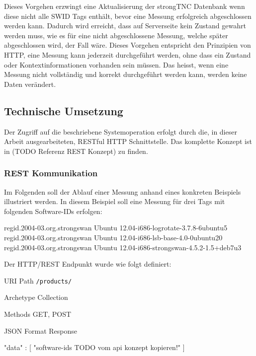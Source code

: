 Dieses Vorgehen erzwingt eine Aktualisierung der strongTNC Datenbank wenn diese
nicht alle SWID Tags enthält, bevor eine Messung erfolgreich abgeschlossen
werden kann. Dadurch wird erreicht, dass auf Serverseite kein Zustand gewahrt
werden muss, wie es für eine nicht abgeschlossene Messung, welche später
abgeschlossen wird, der Fall wäre. Dieses Vorgehen entspricht den Prinzipien von
HTTP, eine Messung kann jederzeit durchgeführt werden, ohne dass ein Zustand
oder Kontextinformationen vorhanden sein müssen. Das heisst, wenn eine Messung
nicht vollständig und korrekt durchgeführt werden kann, werden keine Daten
verändert.



\subsection{Technische Umsetzung}
Der Zugriff auf die beschriebene Systemoperation erfolgt durch die, in dieser Arbeit ausgearbeiteten, RESTful HTTP Schnittstelle. Das komplette Konzept ist in (TODO Referenz REST Konzept) zu finden.

\subsubsection{REST Kommunikation}
Im Folgenden soll der Ablauf einer Messung anhand eines konkreten Beispiels illustriert werden.
In diesem Beispiel soll eine Messung für drei Tags mit folgenden Software-IDs erfolgen:
\begin{textcode}
regid.2004-03.org.strongswan Ubuntu 12.04-i686-logrotate-3.7.8-6ubuntu5
regid.2004-03.org.strongswan Ubuntu 12.04-i686-lsb-base-4.0-0ubuntu20
regid.2004-03.org.strongswan Ubuntu 12.04-i686-strongswan-4.5.2-1.5+deb7u3
\end{textcode}

Der HTTP/REST Endpunkt wurde wie folgt definiert:
\begin{mdframed}[style=def]
\begin{description*}
	\item[URI Path] \texttt{/products/}
	\item[Archetype] Collection
	\item[Methods] GET, POST
	\item[JSON Format Response] \hfill
	
\begin{jsoncode}
{"data" : 
	[
	"software-ids TODO vom api konzept kopieren!" 
	]
}
\end{jsoncode}
\end{description*}
\end{mdframed}



